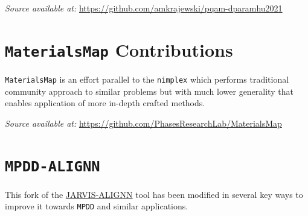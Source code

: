 \hspace{24pt} 
\textit{Source available at:} 
\href{https://github.com/amkrajewski/pqam-dparamhu2021}{https://github.com/amkrajewski/pqam-dparamhu2021}




\section{\texttt{MaterialsMap} Contributions} \label{osoft:sec:materialsmap}

\texttt{MaterialsMap} is an effort parallel to the \texttt{nimplex} which performs traditional community approach to similar problems but with much lower generality that enables application of more in-depth crafted methods.

\hspace{24pt} 
\textit{Source available at:} 
\href{https://github.com/PhasesResearchLab/MaterialsMap}{https://github.com/PhasesResearchLab/MaterialsMap}



\section{\texttt{MPDD-ALIGNN}} \label{osoft:sec:mpddalignn}

This fork of the \href{https://github.com/usnistgov/alignn}{JARVIS-ALIGNN} tool has been modified in several key ways to improve it towards \texttt{MPDD} and similar applications. 

